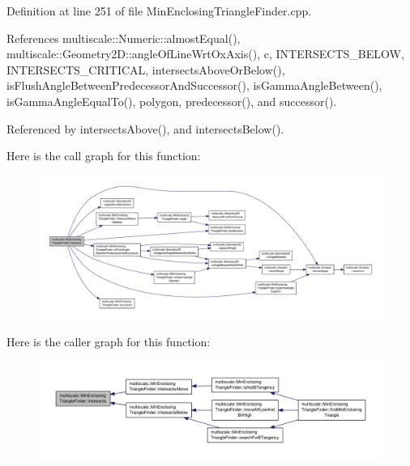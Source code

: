 Definition at line 251 of file Min\-Enclosing\-Triangle\-Finder.\-cpp.



References multiscale\-::\-Numeric\-::almost\-Equal(), multiscale\-::\-Geometry2\-D\-::angle\-Of\-Line\-Wrt\-Ox\-Axis(), c, I\-N\-T\-E\-R\-S\-E\-C\-T\-S\-\_\-\-B\-E\-L\-O\-W, I\-N\-T\-E\-R\-S\-E\-C\-T\-S\-\_\-\-C\-R\-I\-T\-I\-C\-A\-L, intersects\-Above\-Or\-Below(), is\-Flush\-Angle\-Between\-Predecessor\-And\-Successor(), is\-Gamma\-Angle\-Between(), is\-Gamma\-Angle\-Equal\-To(), polygon, predecessor(), and successor().



Referenced by intersects\-Above(), and intersects\-Below().



Here is the call graph for this function\-:\nopagebreak
\begin{figure}[H]
\begin{center}
\leavevmode
\includegraphics[width=350pt]{classmultiscale_1_1MinEnclosingTriangleFinder_a586e3fde222d1464eb57a3e20ceb136c_cgraph}
\end{center}
\end{figure}




Here is the caller graph for this function\-:\nopagebreak
\begin{figure}[H]
\begin{center}
\leavevmode
\includegraphics[width=350pt]{classmultiscale_1_1MinEnclosingTriangleFinder_a586e3fde222d1464eb57a3e20ceb136c_icgraph}
\end{center}
\end{figure}



